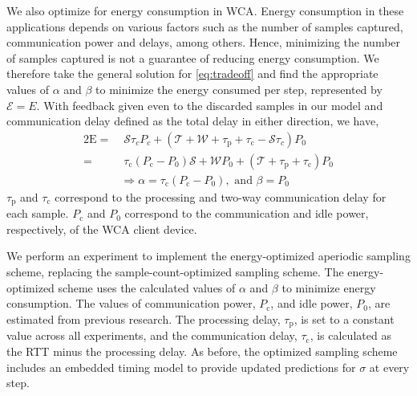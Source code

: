 We also optimize for energy consumption in \gls{WCA}.
Energy consumption in these applications depends on various factors such as the number of samples captured, communication power and delays, among others.
Hence, minimizing the number of samples captured is not a guarantee of reducing energy consumption.
We therefore take the general solution for \cref{eq:tradeoff} and find the appropriate values of \ensuremath{\alpha} and \ensuremath{\beta} to minimize the energy consumed per step, represented by \ensuremath{\mathcal{E}=E}.
With feedback given even to the discarded samples in our model and communication delay defined as the total delay in either direction, we have,
\begin{alignat}{2}
    \mathrm{E}=&\;\mathcal{S}\tau_cP_c+(\mathcal{T}+\mathcal{W}+\tau_\mathrm{p}+\tau_\mathrm{c}-\mathcal{S}\tau_c)P_0\nonumber\\
    =&\;\tau_{\text{c}}(P_{\text{c}} -P_0)\mathcal{S}+\mathcal{W}P_0+(\mathcal{T}+\tau_{\text{p}} +\tau_{\text{c}}) P_0\nonumber\\
    &\Rightarrow \alpha=\tau_{\text{c}}(P_{\text{c}} -P_0),\text{ and }\beta=P_0
\end{alignat}
\( \tau_\text{p} \) and \( \tau_\text{c} \) correspond to the processing and two-way communication delay for each sample.
\( P_\text{c} \) and \( P_0 \) correspond to the communication and idle power, respectively, of the \gls{WCA} client device.

We perform an experiment to implement the energy-optimized aperiodic sampling scheme, replacing the sample-count-optimized sampling scheme.
The energy-optimized scheme uses the calculated values of \ensuremath{\alpha} and \ensuremath{\beta} to minimize energy consumption.
The values of communication power, \ensuremath{P_{\text{c}}}, and idle power, \ensuremath{P_0}, are estimated from previous research.
The processing delay, \ensuremath{\tau_{\text{p}}}, is set to a constant value across all experiments, and the communication delay, \ensuremath{\tau_{\text{c}}}, is calculated as the \gls{RTT} minus the processing delay.
As before, the optimized sampling scheme includes an embedded timing model to provide updated predictions for \ensuremath{\sigma} at every step.

